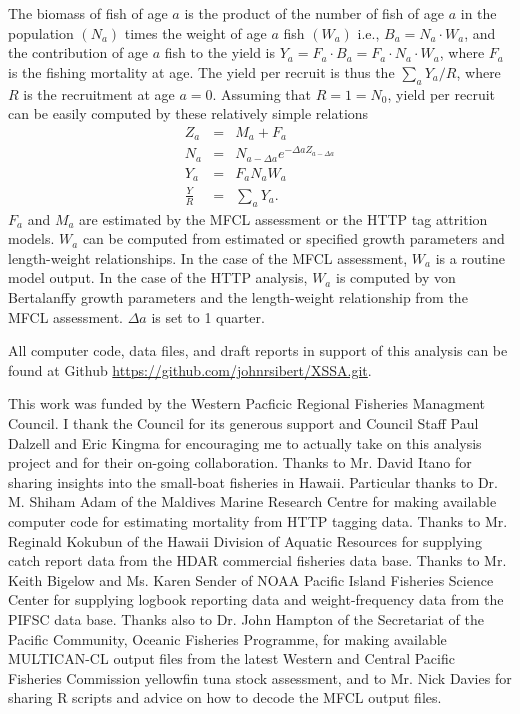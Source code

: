 \documentclass[12pt,letterpaper,twoside]{article}
\newcommand\singlespacing{\baselineskip=1.0\normalbaselineskip}
\begin{document}
The biomass of fish of age $a$ is the product of the number of fish
of age $a$ in the population $(N_a)$ times the weight of age $a$ fish
$(W_a)$ i.e., $B_a=N_a\cdot W_a$, and the contribution of age $a$
fish to the yield is $Y_a=F_a\cdot B_a = F_a\cdot N_a\cdot W_a$, 
where $F_a$ is the fishing mortality at age.  
The yield per recruit is thus the $\sum_a Y_a/R$, where $R$ is the
recruitment at age $a=0$.
%
Assuming that $R = 1 = N_0$, yield per recruit can be easily computed by these
relatively simple relations
\begin{eqnarray}
Z_a &=& M_a +F_a \\
N_a &=& N_{a-\Delta a}e^{-\Delta aZ_{a-\Delta a}}\\
Y_a &=& F_aN_aW_a\\
\frac{Y}{R} &=& \sum_a Y_a.
\end{eqnarray}
$F_a$ and $M_a$ are estimated by the MFCL assessment or the HTTP
tag attrition models.
$W_a$ can be computed from estimated or specified
growth parameters and length-weight relationships. In the case of the
MFCL assessment, $W_a$ is a routine model output. In the case of the
HTTP analysis, $W_a$ is computed by von Bertalanffy growth parameters
and the length-weight relationship from the MFCL assessment.
$\Delta a$ is set to 1 quarter.

All computer code, data files, and draft reports in support of this
analysis can be found at Github
\url{https://github.com/johnrsibert/XSSA.git}.

\singlespacing
\vspace{4ex}
This work was funded by the Western Pacficic Regional Fisheries
Managment Council. I thank the Council for its generous support and
Council Staff Paul Dalzell and Eric Kingma for encouraging me to
actually take on this analysis project and for their on-going
collaboration.
Thanks to Mr. David Itano for sharing insights into the small-boat
fisheries in Hawaii.
Particular thanks to Dr. M. Shiham Adam of the Maldives Marine
Research Centre for making available computer code for estimating
mortality from HTTP tagging data.
Thanks to Mr. Reginald Kokubun of the Hawaii Division of Aquatic
Resources for supplying catch report data from the HDAR commercial
fisheries data base.
Thanks to Mr. Keith Bigelow and Ms. Karen Sender of NOAA Pacific
Island Fisheries Science Center for supplying logbook reporting data and
weight-frequency data from the PIFSC data base.
Thanks also to Dr. John Hampton of the Secretariat of the Pacific
Community, Oceanic Fisheries Programme, for making available
MULTICAN-CL output files from the latest Western and Central Pacific
Fisheries Commission yellowfin tuna stock assessment, and to Mr. Nick
Davies for sharing R scripts and advice on how to decode the MFCL
output files.
\end{document}
